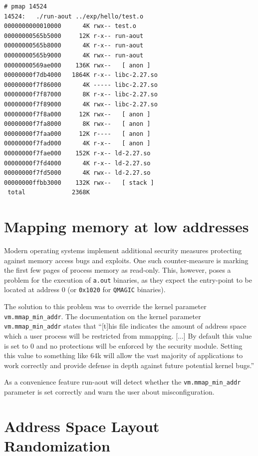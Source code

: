 \documentclass[draft,final]{vutinfth} %
\begin{document}
\begin{lstlisting}[caption={Output of \texttt{pmap} showing the memory mappings of an early prototype of \texttt{run-aout}}, label={lst:pmap_run-aout1}]
# pmap 14524
14524:   ./run-aout ../exp/hello/test.o
0000000000010000      4K rwx-- test.o
00000000565b5000     12K r-x-- run-aout
00000000565b8000      4K r-x-- run-aout
00000000565b9000      4K rwx-- run-aout
00000000569ae000    136K rwx--   [ anon ]
00000000f7db4000   1864K r-x-- libc-2.27.so
00000000f7f86000      4K ----- libc-2.27.so
00000000f7f87000      8K r-x-- libc-2.27.so
00000000f7f89000      4K rwx-- libc-2.27.so
00000000f7f8a000     12K rwx--   [ anon ]
00000000f7fa8000      8K rwx--   [ anon ]
00000000f7faa000     12K r----   [ anon ]
00000000f7fad000      4K r-x--   [ anon ]
00000000f7fae000    152K r-x-- ld-2.27.so
00000000f7fd4000      4K r-x-- ld-2.27.so
00000000f7fd5000      4K rwx-- ld-2.27.so
00000000ffbb3000    132K rwx--   [ stack ]
 total             2368K
\end{lstlisting}

\section{Mapping memory at low addresses}
\label{explore_low_mmap}

Modern operating systems implement additional security measures protecting against memory access bugs and exploits. One such counter-measure is marking the first few pages of process memory as read-only. This, however, poses a problem for the execution of \texttt{a.out} binaries, as they expect the entry-point to be located at address 0 (or \texttt{0x1020} for \texttt{QMAGIC} binaries).

The solution to this problem was to override the kernel parameter \texttt{vm.mmap\_min\_addr}. The documentation on the kernel parameter \texttt{vm.mmap\_min\_addr}\cite{KernelParam1} states that ``[t]his file indicates the amount of address space which a user process will be restricted from mmapping. [...] By default this value is set to 0 and no protections will be enforced by the security module. Setting this value to something like 64k will allow the vast majority of applications to work correctly and provide defense in depth against future potential kernel bugs.''

As a convenience feature run-aout will detect whether the \texttt{vm.mmap\_min\_addr} parameter is set correctly and warn the user about misconfiguration.

\section{Address Space Layout Randomization}
\label{explore_aslr}
\end{document}
